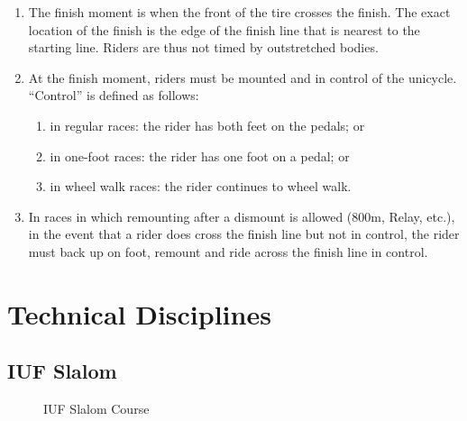 \begin{enumerate}[leftmargin=1.5em,labelsep=*]
	\item The finish moment is when the front of the tire crosses the finish.
	The exact location of the finish is the edge of the finish line that is nearest to the starting line.
	Riders are thus not timed by outstretched bodies.
	
	\item At the finish moment, riders must be mounted and in control of the unicycle.
	``Control'' is defined as follows:
	
	\begin{enumerate}[label=(\alph*)]
		\item in regular races: the rider has both feet on the pedals; or
		
		\item in one-foot races: the rider has one foot on a pedal; or
		
		\item in wheel walk races: the rider continues to wheel walk.
	\end{enumerate}
	
	\item In races in which remounting after a dismount is allowed (800m, Relay, etc.\@), in the event that a 
  rider does cross the finish line but not in control, the rider must back up on foot, remount and 
  ride across the finish line in control.
\end{enumerate}

\section{Technical Disciplines}

\subsection{IUF Slalom}

\begin{figure}[h]
	\begin{center}
	\end{center}
	\vspace{-20pt}
	\caption{IUF Slalom Course \label{fig:iuf_slalom}}
	\vspace{-10pt}
\end{figure}

